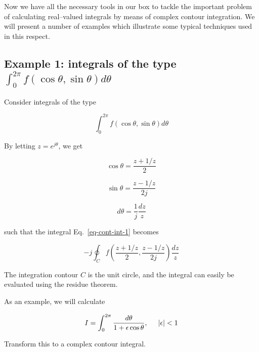 
Now we have all the necessary tools in our box to tackle the important problem
of calculating real--valued integrals by means of complex contour integration.
We will present a number of examples which illustrate some typical techniques
used in this respect.

\subsection*{Example 1: integrals of the type $\int_0^{2 \pi} f(\cos \theta, \sin \theta) d \theta$}

Consider integrals of the type

\begin{equation}
\int_0^{2 \pi} f(\cos \theta, \sin \theta) d \theta \label{eq-cont-int-1}
\end{equation} 

By letting $z=e^{j \theta}$, we get 

\begin{equation}
\cos \theta = \frac{z + 1/z}{2}
\end{equation} 

\begin{equation}
\sin \theta = \frac{z - 1/z}{2j}
\end{equation} 

\begin{equation}
d \theta = \frac{1}{j}\frac{dz}{z}
\end{equation} 

such that the integral Eq.~\ref{eq-cont-int-1} becomes

\begin{equation}
-j \oint_{{C}} f\left(\frac{z + 1/z}{2}, \frac{z - 1/z}{2j}\right)
\frac{dz}{z}
\end{equation} 

The integration contour ${C}$ is the unit circle, and the integral can easily be evaluated using the residue theorem.

As an example, we will calculate

\begin{equation}
I = \int_0^{2 \pi} \frac{d \theta}{1 + \epsilon \cos \theta}, \hspace{0.5cm}
|\epsilon| < 1
\end{equation} 

\begin{cue}
  Transform this to a complex contour integral.
\end{cue}

